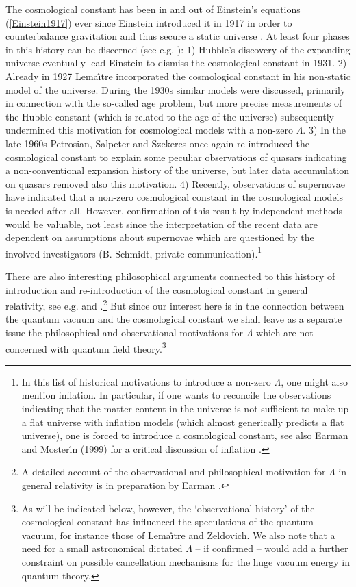 \documentclass[12pt]{article}
\begin{document}
The cosmological constant
has been in and out of Einstein's equations (\ref{Einstein1917})
ever since Einstein introduced it in 1917 in order to
counterbalance gravitation and thus secure a static universe
\cite{north65,kragh96,ray90}. At least four phases in this history
can be discerned (see e.g. \cite{north65,petrosian74,sahni99}): 
1) Hubble's discovery of the expanding universe
eventually lead Einstein to dismiss the cosmological constant in
1931. 2) Already in 1927 Lema\^\i tre incorporated the cosmological
constant in his non-static model of the universe. During the 1930s
similar models were discussed, primarily in connection with the
so-called age problem, but more precise measurements of the Hubble
constant (which is related to the age of the universe) subsequently
undermined this motivation for cosmological models with a non-zero
$\Lambda$.  3) In the late 1960s Petrosian, Salpeter and Szekeres once
again re-introduced the cosmological constant to explain some peculiar
observations of quasars indicating a non-conventional expansion
history of the universe, but later data accumulation on quasars
removed also this motivation. 4) Recently, observations of supernovae
have indicated that a non-zero cosmological constant in the
cosmological models is needed after all.  However, confirmation of
this result by independent methods would be valuable, not least since
the interpretation of the recent data are dependent on assumptions
about supernovae which are questioned by the involved investigators
(B. Schmidt, private communication).\footnote{In this list of
historical motivations to introduce a non-zero $\Lambda$, one might
also mention inflation. In particular, if one wants to reconcile the
observations indicating that the matter content in the universe is not
sufficient to make up a flat universe with inflation models (which
almost generically predicts a flat universe), one is forced to
introduce a cosmological constant, see also Earman and Moster\' \i n
(1999) for a critical discussion of inflation \cite{earman99}.}

There are also interesting philosophical arguments connected to
this history of introduction and re-introduction of the
cosmological constant in general relativity, see e.g.
\cite{north65} and \cite{ray90}.\footnote{A detailed account of
the observational and philosophical motivation for $\Lambda$ in
general relativity is in preparation by Earman \cite{earman00}.}
But since our interest here is in the connection between the
quantum vacuum and the cosmological constant we shall leave as a
separate issue the philosophical and observational motivations for
$\Lambda$ which are not concerned with quantum field
theory.\footnote{As will be indicated below, however, the
`observational history' of the cosmological constant has
influenced the speculations of the quantum vacuum, for instance
those of Lema\^ \i tre and Zeldovich. We also note that a need
for a small astronomical dictated $\Lambda$ -- if confirmed --
would add a further constraint on possible cancellation mechanisms
for the huge vacuum energy in quantum theory.}
\end{document}
